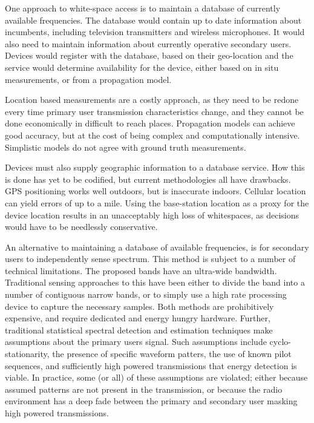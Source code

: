 One approach to white-space access is to maintain a database of currently available frequencies. The database would contain up to date information about incumbents, including television transmitters and wireless microphones. It would also need to maintain information about currently operative secondary users. Devices would register with the database, based on their geo-location and the service would determine availability for the device, either based on in situ measurements, or from a propagation model.

Location based measurements are a costly approach, as they need to be redone every time primary user transmission characteristics change, and they cannot be done economically in difficult to reach places. Propagation models can achieve good accuracy, but at the cost of being complex and computationally intensive. Simplistic models do not agree with ground truth measurements. 

Devices must also supply geographic information to a database service. How this is done has yet to be codified, but current methodologies all have drawbacks. GPS positioning works well outdoors, but is inaccurate indoors. Cellular location can yield errors of up to a mile. Using the base-station location as a proxy for the device location results in an unacceptably high loss of whitespaces, as decisions would have to be needlessly conservative.

An alternative to maintaining a database of available frequencies, is for secondary users to independently sense spectrum. This method is subject to a number of technical limitations. The proposed bands have an ultra-wide bandwidth. Traditional sensing approaches to this have been either to divide the band into a number of contiguous narrow bands, or to simply use a high rate processing device to capture the necessary samples. Both methods are prohibitively expensive, and require dedicated and energy hungry hardware. Further, traditional statistical spectral detection and estimation techniques make assumptions about the primary users signal. Such assumptions include cyclo-stationarity, the presence of specific waveform patters, the use of known pilot sequences, and sufficiently high powered transmissions that energy detection is viable. In practice, some (or all) of these assumptions are violated; either because assumed patterns are not present in the  transmission, or because the radio environment has a deep fade between the primary and secondary user masking high powered transmissions.

